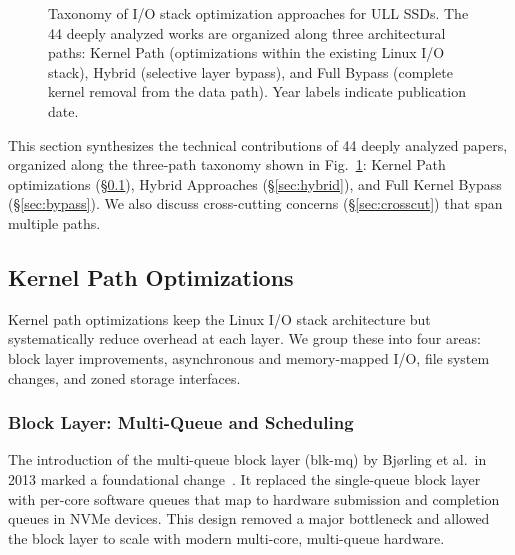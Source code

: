 \documentclass[conference]{IEEEtran}
\begin{document}
\begin{figure}[!t]
{
}%
\caption{Taxonomy of I/O stack optimization approaches for ULL SSDs. The 44 deeply analyzed works are organized along three architectural paths: Kernel Path (optimizations within the existing Linux I/O stack), Hybrid (selective layer bypass), and Full Bypass (complete kernel removal from the data path). Year labels indicate publication date.}
\label{fig:taxonomy}
\end{figure}

This section synthesizes the technical contributions of 44 deeply analyzed papers, organized along the three-path taxonomy shown in Fig.~\ref{fig:taxonomy}: Kernel Path optimizations (\S\ref{sec:kernel}), Hybrid Approaches (\S\ref{sec:hybrid}), and Full Kernel Bypass (\S\ref{sec:bypass}). We also discuss cross-cutting concerns (\S\ref{sec:crosscut}) that span multiple paths.

\subsection{Kernel Path Optimizations}
\label{sec:kernel}

Kernel path optimizations keep the Linux I/O stack architecture but systematically reduce overhead at each layer. We group these into four areas: block layer improvements, asynchronous and memory-mapped I/O, file system changes, and zoned storage interfaces.

\subsubsection{Block Layer: Multi-Queue and Scheduling}
\label{sec:blkmq}

The introduction of the multi-queue block layer (blk-mq) by Bj{\o}rling et al.\ in 2013 marked a foundational change~\cite{bjorling2013linux}. It replaced the single-queue block layer with per-core software queues that map to hardware submission and completion queues in NVMe devices. This design removed a major bottleneck and allowed the block layer to scale with modern multi-core, multi-queue hardware.
\end{document}

